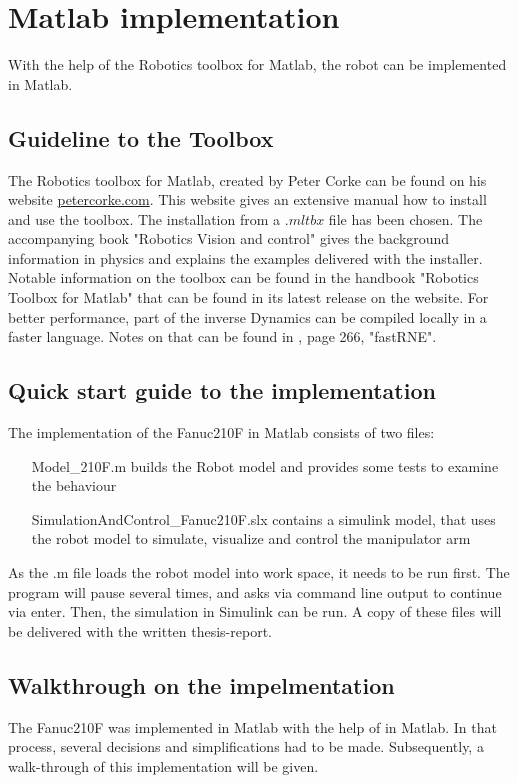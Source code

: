 \section{Matlab implementation}

With the help of the Robotics toolbox for Matlab, the robot can be implemented in Matlab.

\subsection{Guideline to the Toolbox}

The Robotics toolbox for Matlab, created by Peter Corke can be found on his website \url{petercorke.com}. This website gives an extensive manual how to install and use the toolbox. The installation from a $.mltbx$ file has been chosen. 
The accompanying book "Robotics Vision and control" gives the background information in physics and explains the examples delivered with the installer. Notable information on the toolbox can be found in the handbook "Robotics Toolbox for Matlab" that can be found in its latest release on the website.
For better performance, part of the inverse Dynamics can be compiled locally in a faster language. Notes on that can be found in \cite{CorkeRoboticVisionControl}, page 266, "fastRNE".

\subsection{Quick start guide to the implementation}
The implementation of the Fanuc210F in Matlab consists of two files:\\
\begin{itemize}
	\item[Model_210F.m] builds the Robot model and provides some tests to examine the behaviour
	\item[SimulationAndControl_Fanuc210F.slx] contains a simulink model, that uses the robot model to simulate, visualize and control the manipulator arm
\end{itemize}

As the .m file loads the robot model into work space, it needs to be run first. The program will pause several times, and asks via command line output to continue via enter.  Then, the simulation in Simulink can be run.
A copy of these files will be delivered with the written thesis-report.

\subsection{Walkthrough on the impelmentation}
The Fanuc210F was implemented in Matlab with the help of \cite{CorkeRoboticVisionControl} in Matlab. In that process, several decisions and simplifications had to be made. Subsequently, a walk-through of this implementation will be given.

